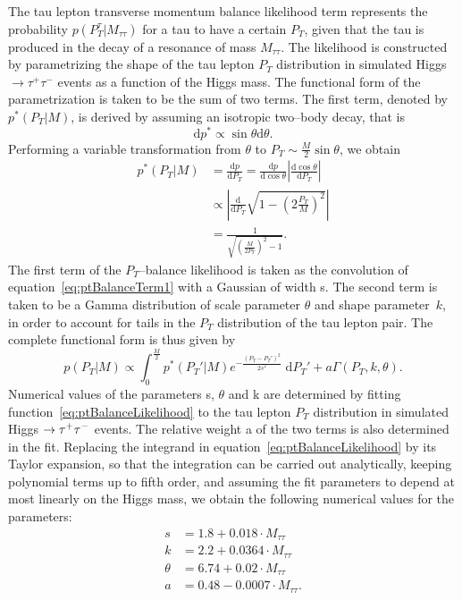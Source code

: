 The tau lepton transverse momentum balance likelihood term represents the
probability $p \left( P^{\tau}_{T} | M_{\tau\tau} \right)$ for a tau to have a
certain $P_{T}$, given that the tau is produced in the decay of a resonance of
mass $M_{\tau\tau}$.  The likelihood is constructed by parametrizing the shape
of the tau lepton $P_{T}$ distribution in simulated Higgs $\to \tau^{+}
\tau^{-}$ events as a function of the Higgs mass.  The functional form of the
parametrization is taken to be the sum of two terms.  The first term, denoted by
$p^{*} \left( P_{T} | M \right)$, is derived by assuming an isotropic two--body
decay, that is
\begin{equation*}
\mathrm{d}p^{*} \propto \sin\theta \mathrm{d}\theta.
\end{equation*}
Performing a variable transformation from $\theta$ to $P_{T} \sim \frac{M}{2}
\sin\theta$, we obtain
\begin{align}
p^{*} \left( P_{T} | M \right) &= \frac{\mathrm{d}p}{\mathrm{d}P_T} = \frac{\mathrm{d}p}{\mathrm{d}\cos\theta}
\left| \frac{\mathrm{d}\cos\theta}{\mathrm{d}P_T} \right| \nonumber \\
&\propto \left| \frac{\mathrm{d}}{\mathrm{d}P_T} \sqrt{1 - \left(2 \frac{P_T}{M} \right)^2} \right| \nonumber \\
&= \frac{1}{\sqrt{\left( \frac{M}{2 P_{T}} \right)^2 - 1}}. 
\label{eq:ptBalanceTerm1}
\end{align}
The first term of the $P_{T}$--balance likelihood is taken as the convolution of
equation~\ref{eq:ptBalanceTerm1} with a Gaussian of width s.  The second term is
taken to be a Gamma distribution of scale parameter $\theta$ and shape
parameter~$k$, in order to account for tails in the $P_{T}$ distribution of the
tau lepton pair.  The complete functional form is thus given by
\begin{equation}
p \left( P_{T} | M \right) \propto \int_0^{\frac{M}{2}} \! p^* \left( P_{T}' | M \right) 
 e^{-\frac{\left( P_{T} - P_{T}' \right)^2}{2 s^2}} \; \mathrm{d}P_T' + a \Gamma \left( P_T, k, \theta \right).
\label{eq:ptBalanceLikelihood}
\end{equation}
Numerical values of the parameters s, $\theta$ and k are determined by fitting
function~\ref{eq:ptBalanceLikelihood} to the tau lepton $P_{T}$ distribution in
simulated Higgs $\to\tau^+\tau^-$ events.  The relative weight a of the
two terms is also determined in the fit.  Replacing the integrand in
equation~\ref{eq:ptBalanceLikelihood} by its Taylor expansion, so that the
integration can be carried out analytically, keeping polynomial terms up to
fifth order, and assuming the fit parameters to depend at most linearly on the
Higgs mass, we obtain the following numerical values for the parameters:
\begin{align}
s &= 1.8 + 0.018 \cdot M_{\tau\tau} \nonumber \\
k &= 2.2 + 0.0364 \cdot M_{\tau\tau} \nonumber \\
\theta &= 6.74 + 0.02 \cdot M_{\tau\tau} \nonumber \\
a &= 0.48 - 0.0007 \cdot M_{\tau\tau}. \nonumber 
\end{align}

